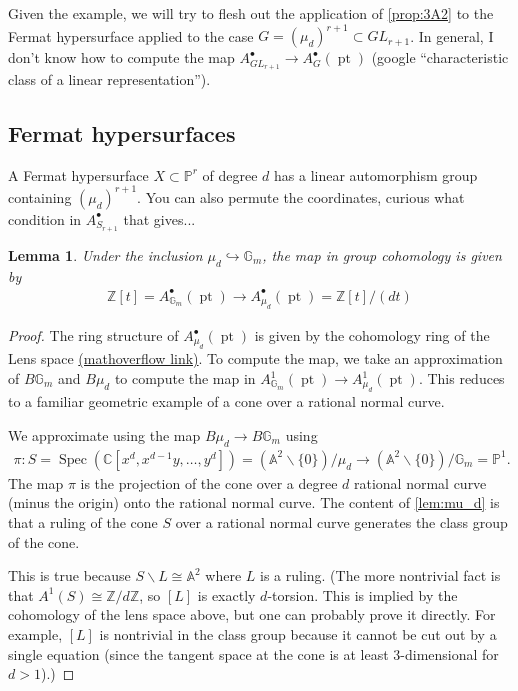 \documentclass[12 pt]{amsart}
\newtheorem{lemma}{Lemma}[section]
\newcommand{\<}{\left\langle}
\renewcommand{\>}{\right\rangle}
\begin{document}
Given the example, we will try to flesh out the application of \autoref{prop:3A2} to the Fermat hypersurface applied to the case $G=(\mu_d)^{r+1}\subset GL_{r+1}$. In general, I don't know how to compute the map $A^{\bullet}_{GL_{r+1}}\to A^{\bullet}_{G}(\operatorname{pt})$ (google ``characteristic class of a linear representation''). 

\subsection{Fermat hypersurfaces}
A Fermat hypersurface $X\subset \mathbb{P}^r$ of degree $d$ has a linear automorphism group containing $(\mu_d)^{r+1}$. {\color{red} You can also permute the coordinates, curious what condition in $A^{\bullet}_{S_{r+1}}$ that gives...}

\begin{lemma}
\label{lem:mu_d}
Under the inclusion $\mu_d\hookrightarrow \mathbb{G}_m$, the map in group cohomology is given by 
\begin{align*}
    \mathbb{Z}[t]=A^{\bullet}_{\mathbb{G}_m}(\operatorname{pt})\to A^{\bullet}_{\mu_d}(\operatorname{pt})=\mathbb{Z}[t]/(dt)
\end{align*}
\end{lemma}

\begin{proof}
The ring structure of $A^{\bullet}_{\mu_d}(\operatorname{pt})$ is given by the cohomology ring of the Lens space 
\href{https://mathoverflow.net/questions/133974/reference-for-ring-structure-on-group-cohomology}{(mathoverflow link)}. To compute the map, we take an approximation of $B\mathbb{G}_m$ and $B\mu_d$ to compute the map in $A^{1}_{\mathbb{G}_m}(\operatorname{pt})\to A^{1}_{\mu_d}(\operatorname{pt})$. This reduces to a familiar geometric example of a cone over a rational normal curve.

We approximate using the map $B\mu_d\to B\mathbb{G}_m$ using
\begin{align*}
    \pi: S=\operatorname{Spec}(\mathbb{C}[x^d, x^{d-1}y,\ldots,y^d])=(\mathbb{A}^2\backslash\{0\})/\mu_d\to (\mathbb{A}^2\backslash\{0\})/\mathbb{G}_m=\mathbb{P}^1. 
\end{align*}
The map $\pi$ is the projection of the cone over a degree $d$ rational normal curve (minus the origin) onto the rational normal curve. The content of \autoref{lem:mu_d} is that a ruling of the cone $S$ over a rational normal curve generates the class group of the cone. 

This is true because $S\backslash L\cong \mathbb{A}^2$ where $L$ is a ruling. (The more nontrivial fact is that $A^{1}(S)\cong \mathbb{Z}/d\mathbb{Z}$, so $[L]$ is exactly $d$-torsion. This is implied by the cohomology of the lens space above, but one can probably prove it directly. For example, $[L]$ is nontrivial in the class group because it cannot be cut out by a single equation (since the tangent space at the cone is at least 3-dimensional for $d>1$).) 
\end{proof}
\end{document}
